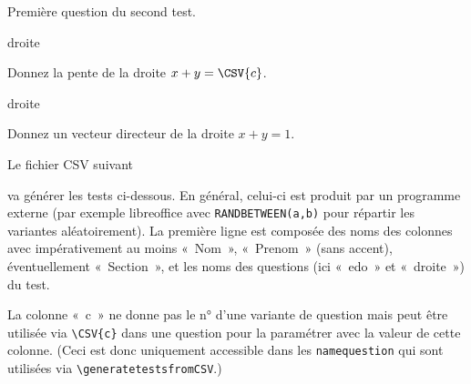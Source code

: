 \documentclass[12pt,a4paper, rulers%
]{tests}
\begin{document}
\begin{question}
  Première question du second test.
\end{question}


\begin{namequestion}{droite}
  \begin{question}
    Donnez la pente de la droite $x + y = \CSV{c}$.
  \end{question}
\end{namequestion}
\begin{namequestion}{droite}
  \begin{question}
    Donnez un vecteur directeur de la droite $x + y = 1$.    
  \end{question}
\end{namequestion}

\newpage
Le fichier CSV suivant

va générer les tests ci-dessous.  En général, celui-ci est produit
par un programme externe (par exemple libreoffice avec
\verb+RANDBETWEEN(a,b)+ pour répartir les variantes aléatoirement).
La première ligne est composée des noms des
colonnes avec impérativement au moins «~Nom~», «~Prenom~» (sans
accent), éventuellement «~Section~», et les noms des questions (ici
«~edo~» et «~droite~») du test.

La colonne «~c~» ne donne pas le n° d'une variante de question mais
peut être utilisée via \verb+\CSV{c}+ dans une question pour la
paramétrer avec la valeur de cette colonne.  (Ceci est donc uniquement
accessible dans les \verb+namequestion+ qui sont utilisées via
\verb+\generatetestsfromCSV+.)

\end{document}
